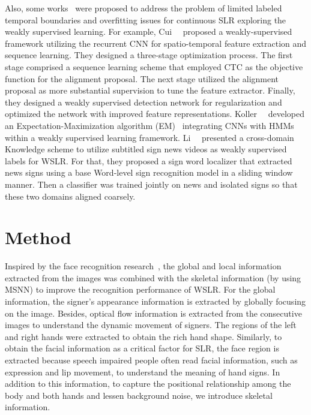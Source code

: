 \documentclass[journal]{IEEEtran}
\begin{document}
Also, some works~\cite{koller2016deeph, li2020transferring, cui2017recurrent} were proposed to address the problem of limited labeled temporal boundaries and overfitting issues for continuous SLR exploring the weakly supervised learning. For example, Cui~\etal~\cite{cui2017recurrent} proposed a weakly-supervised framework utilizing the recurrent CNN for spatio-temporal feature extraction and sequence learning. They designed a three-stage optimization process. The first stage comprised a sequence learning scheme that employed CTC as the objective function for the alignment proposal. The next stage utilized the alignment proposal as more substantial supervision to tune the feature extractor. Finally, they designed a weakly supervised detection network for regularization and optimized the network with improved feature representations. Koller~\etal~\cite{koller2016deeph} developed an Expectation-Maximization algorithm (EM)~\cite{dempster1977maximum} integrating CNNs with HMMs within a weakly supervised learning framework. Li~\etal~\cite{li2020transferring} presented a cross-domain Knowledge scheme to utilize subtitled sign news videos as weakly supervised labels for WSLR. For that, they proposed a sign word localizer that extracted news signs using a base Word-level sign recognition model in a sliding window manner. Then a classifier was trained jointly on news and isolated signs so that these two domains aligned coarsely.



\section{Method} \label{proposed_method}
Inspired by the face recognition research~\cite{adria2018zoom}, the global and local information extracted from the images was combined with the skeletal information (by using MSNN) to improve the recognition performance of WSLR. For the global information, the signer's appearance information is extracted by globally focusing on the image. Besides, optical flow information is extracted from the consecutive images to understand the dynamic movement of signers. The regions of the left and right hands were extracted to obtain the rich hand shape. Similarly, to obtain the facial information as a critical factor for SLR, 
the face region is extracted because speech impaired people often read facial information, such as expression and lip movement, to understand the meaning of hand signs. In addition to this information, to capture the positional relationship among the body and both hands and lessen background noise, we introduce skeletal information. 
\end{document}
